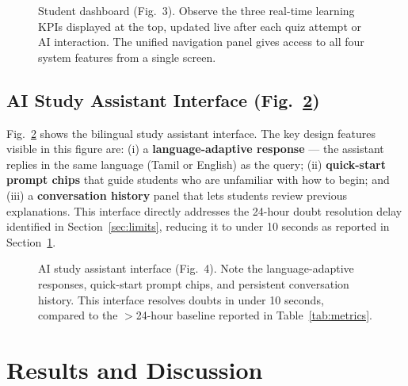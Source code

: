 \documentclass[conference]{IEEEtran}
\begin{document}
\begin{figure}[h]
\centering
{}
\caption{Student dashboard (Fig.~3). Observe the three real-time learning KPIs displayed at the top, updated live after each quiz attempt or AI interaction. The unified navigation panel gives access to all four system features from a single screen.}
\label{fig:dashboard}
\end{figure}

\subsection{AI Study Assistant Interface (Fig.~\ref{fig:assistant})}

Fig.~\ref{fig:assistant} shows the bilingual study assistant interface. The key design features visible in this figure are: (i) a \textbf{language-adaptive response} — the assistant replies in the same language (Tamil or English) as the query; (ii) \textbf{quick-start prompt chips} that guide students who are unfamiliar with how to begin; and (iii) a \textbf{conversation history} panel that lets students review previous explanations. This interface directly addresses the 24-hour doubt resolution delay identified in Section~\ref{sec:limits}, reducing it to under 10 seconds as reported in Section~\ref{sec:results}.

\begin{figure}[h]
\centering
{}
\caption{AI study assistant interface (Fig.~4). Note the language-adaptive responses, quick-start prompt chips, and persistent conversation history. This interface resolves doubts in under 10 seconds, compared to the $>$24-hour baseline reported in Table~\ref{tab:metrics}.}
\label{fig:assistant}
\end{figure}

\section{Results and Discussion}
\label{sec:results}
\end{document}
